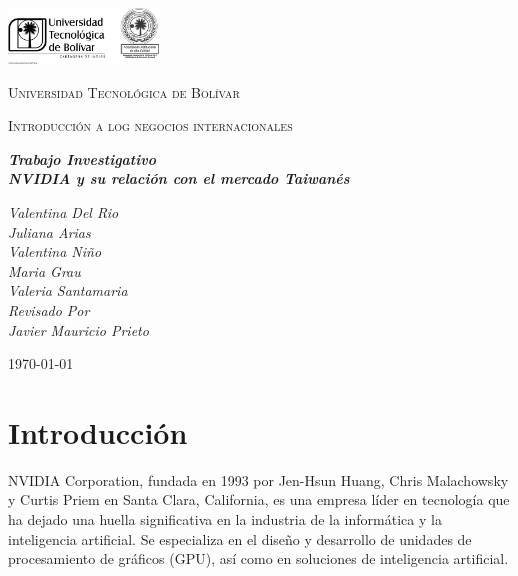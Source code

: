 \documentclass[twocolumn, 12pt]{article}
\begin{document}
\begin{titlepage}
      \centering
      \includegraphics[width=0.3\textwidth]{Images/logo_utb.png}\par\vspace{1cm}
      {\scshape\LARGE Universidad Tecnológica de Bolívar \par}
      \vspace{.5cm}

      {\scshape\Large Introducción a log negocios internacionales \par}
      \vspace{.2cm}

      \slshape {\Large \bfseries{}Trabajo Investigativo\\}
      \slshape {\small \bfseries{}NVIDIA y su relación con el mercado Taiwanés}
      \vspace{1cm}

      \slshape {\itshape{} Valentina Del Rio \\}
      \slshape {\itshape{} Juliana Arias \\}
      \slshape {\itshape{} Valentina Niño \\}
      \slshape {\itshape{} Maria Grau \\}
      \slshape {\itshape{} Valeria Santamaria \\}
      \vfill
      Revisado Por \\
      Javier Mauricio Prieto \\
      {\large \today\par}
\end{titlepage}


\nocite{*}

\section{Introducción}

NVIDIA Corporation, fundada en 1993 por Jen-Hsun Huang, Chris
Malachowsky y Curtis Priem en Santa Clara, California, es una
empresa líder en tecnología que ha dejado una huella
significativa en la industria de la informática y la
inteligencia artificial. Se especializa en el diseño y
desarrollo de unidades de procesamiento de gráficos (GPU),
así como en soluciones de inteligencia artificial.
\end{document}
